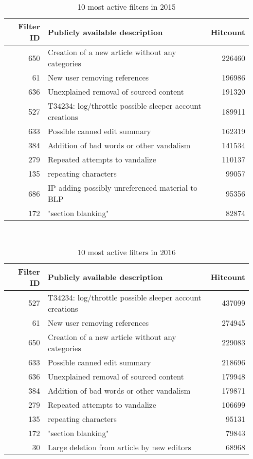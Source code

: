 \begin{table}
  \centering
  \begin{tabular}{r p{9cm} r }
    Filter ID & Publicly available description & Hitcount \\
    \hline
    650 & Creation of a new article without any categories & 226460 \\
    61 & New user removing references & 196986 \\
    636 & Unexplained removal of sourced content & 191320 \\
    527 & T34234: log/throttle possible sleeper account creations & 189911 \\
    633 & Possible canned edit summary & 162319 \\
    384 & Addition of bad words or other vandalism & 141534 \\
    279 & Repeated attempts to vandalize & 110137 \\
    135 & repeating characters & 99057 \\
    686 & IP adding possibly unreferenced material to BLP & 95356 \\
    172 & "section blanking" & 82874 \\
  \end{tabular}
  \caption{10 most active filters in 2015}~\label{tab:app-most-active-2015}
\end{table}

\begin{table}
  \centering
  \begin{tabular}{r p{9cm} r }
    Filter ID & Publicly available description & Hitcount \\
    \hline
    527 & T34234: log/throttle possible sleeper account creations & 437099 \\
    61 & New user removing references & 274945 \\
    650 & Creation of a new article without any categories & 229083 \\
    633 & Possible canned edit summary & 218696 \\
    636 & Unexplained removal of sourced content & 179948 \\
    384 & Addition of bad words or other vandalism & 179871 \\
    279 & Repeated attempts to vandalize & 106699 \\
    135 & repeating characters & 95131 \\
    172 & "section blanking" & 79843 \\
    30 & Large deletion from article by new editors & 68968 \\
  \end{tabular}
  \caption{10 most active filters in 2016}~\label{tab:app-most-active-2016}
\end{table}

